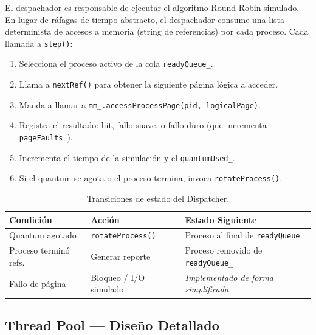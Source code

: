 \documentclass[12pt,letterpaper]{article}
\begin{document}
El despachador es responsable de ejecutar el algoritmo Round Robin simulado.
En lugar de ráfagas de tiempo abstracto, el despachador consume una lista determinista de accesos a memoria (string de referencias) por cada proceso.
Cada llamada a \texttt{step()}:
\begin{enumerate}
    \item Selecciona el proceso activo de la cola \texttt{readyQueue\_}.
    \item Llama a \texttt{nextRef()} para obtener la siguiente página lógica a acceder.
    \item Manda a llamar a \texttt{mm\_.accessProcessPage(pid, logicalPage)}.
    \item Registra el resultado: hit, fallo suave, o fallo duro (que incrementa \texttt{pageFaults\_}).
    \item Incrementa el tiempo de la simulación y el \texttt{quantumUsed\_}.
    \item Si el quantum se agota o el proceso termina, invoca \texttt{rotateProcess()}.
\end{enumerate}

\begin{table}[H]
\centering
{}
\begin{tabular}{@{}lll@{}}
\toprule
\rowcolor{catBlue!40}
\textbf{Condición} & \textbf{Acción} & \textbf{Estado Siguiente} \\ \midrule
Quantum agotado & \texttt{rotateProcess()} & Proceso al final de \texttt{readyQueue\_} \\
Proceso terminó refs.
& Generar reporte & Proceso removido de \texttt{readyQueue\_} \\
Fallo de página & Bloqueo / I/O simulado & \textit{Implementado de forma simplificada} \\ \bottomrule
\end{tabular}
\caption{Transiciones de estado del Dispatcher.}
\end{table}

\subsection{Thread Pool --- Diseño Detallado}
\end{document}

